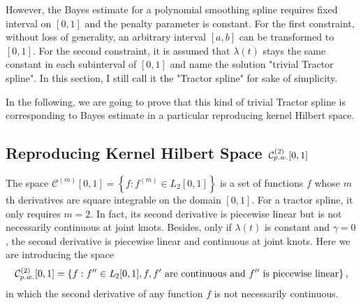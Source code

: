However, the Bayes estimate for a polynomial smoothing spline requires fixed interval on $[0,1]$ and the penalty parameter is constant. For the first constraint, without loss of generality, an arbitrary interval $[a,b]$ can be transformed to $[0,1]$. For the second constraint, it is assumed that $\lambda(t)$ stays the same constant in each subinterval of $[0,1]$ and name the solution "trivial Tractor spline".  In this section, I still call it the "Tractor spline" for sake of simplicity. 

In the following, we are going to prove that this kind of trivial Tractor spline is corresponding to Bayes estimate in a particular reproducing kernel Hilbert space. 


\subsection{Reproducing Kernel Hilbert Space $\mathcal{C}_{\footnotesize p.w.}^{(2)}[0,1]$}

The space $\mathcal{C}^{(m)}[0,1]=\left\lbrace  f:f^{(m)}\in \mathit{L}_2[0,1] \right\rbrace$ is a set of functions $f$ whose $m$th derivatives are square integrable on the domain $[0,1]$. For a tractor spline, it only requires $m=2$. In fact, its second derivative is piecewise linear but is not necessarily continuous at joint knots. Besides, only if $\lambda(t)$ is constant and $\gamma=0$, the second derivative is piecewise linear and continuous at joint knots. Here we are introducing the space 
\begin{equation*}
\mathcal{C}_{\footnotesize p.w.}^{(2)}[0,1]=\left\lbrace f: f''\in \mathit{L}_2[0,1], f,f' \mbox{ are continuous and } f'' \mbox{ is piecewise linear}\right\rbrace,
\end{equation*}
in which the second derivative of any function $f$ is not necessarily continuous. 


